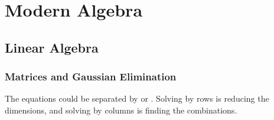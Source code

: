 \section{Modern Algebra}

\subsection{Linear Algebra}

\subsubsection{Matrices and Gaussian Elimination}

The equations could be separated by  or .
Solving by rows is reducing the dimensions, and solving by columns is finding the combinations.